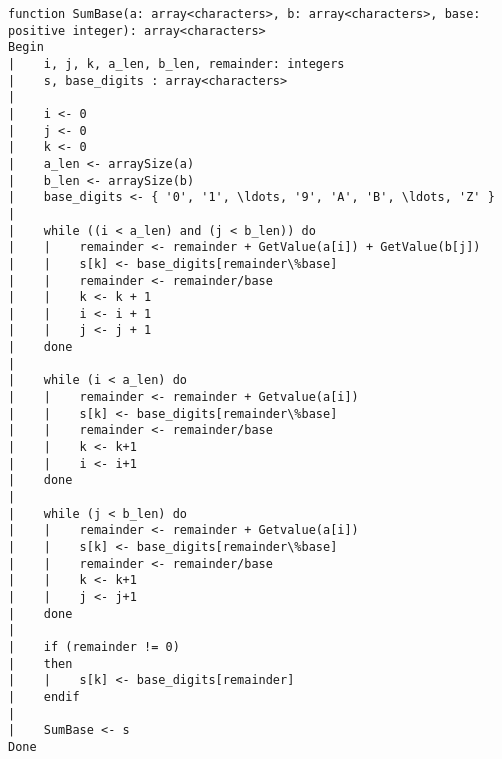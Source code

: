 \begin{lstlisting}[breaklines]
function SumBase(a: array<characters>, b: array<characters>, base: positive integer): array<characters>
Begin
|    i, j, k, a_len, b_len, remainder: integers
|    s, base_digits : array<characters>
|
|    i <- 0
|    j <- 0
|    k <- 0
|    a_len <- arraySize(a)
|    b_len <- arraySize(b)
|    base_digits <- { '0', '1', \ldots, '9', 'A', 'B', \ldots, 'Z' }
|
|    while ((i < a_len) and (j < b_len)) do
|    |    remainder <- remainder + GetValue(a[i]) + GetValue(b[j])
|    |    s[k] <- base_digits[remainder\%base]
|    |    remainder <- remainder/base
|    |    k <- k + 1
|    |    i <- i + 1
|    |    j <- j + 1
|    done
|
|    while (i < a_len) do
|    |    remainder <- remainder + Getvalue(a[i])
|    |    s[k] <- base_digits[remainder\%base]
|    |    remainder <- remainder/base
|    |    k <- k+1
|    |    i <- i+1
|    done
|    
|    while (j < b_len) do
|    |    remainder <- remainder + Getvalue(a[i])
|    |    s[k] <- base_digits[remainder\%base]
|    |    remainder <- remainder/base
|    |    k <- k+1
|    |    j <- j+1
|    done
|
|    if (remainder != 0)
|    then
|    |    s[k] <- base_digits[remainder]
|    endif
|
|    SumBase <- s
Done
\end{lstlisting}